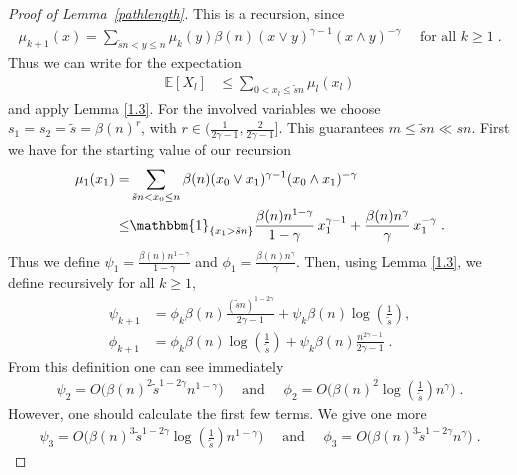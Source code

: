 \documentclass[10pt,a4paper]{amsart}
\begin{document}
\begin{proof}[Proof of Lemma~\ref{pathlength}]
	This is a recursion, since
\begin{align} \label{recurmu}
  \mu_{k+1}(x)=\sum_{\tilde sn<y\le n}\mu_k(y) \beta(n) (x \vee y)^{\gamma-1}(x \wedge y)^{-\gamma} \quad \text{ for all } k\ge1 \; .
\end{align}
Thus we can write for the expectation
\begin{align} \label{14}
		\mathbb{E}[X_l]&\le \sum_{0<x_l\le \tilde sn} \mu_l(x_l)
\end{align}
and apply Lemma \ref{1.3}. For the involved variables  we choose $s_1=s_2=\tilde s =\beta(n)^{r}$, with $r\in(\tfrac{1}{2\gamma-1},\tfrac{2}{2\gamma-1}]$. This guarantees $m\le \tilde s n \ll sn$.
 First we have for the starting value of our recursion
\begin{align*}
    \mu_1(x_1)= & \sum_{\tilde sn<x_{0}\le n} \beta(n)(x_0 \vee x_{1})^{\gamma-1}(x_0 \wedge x_{1})^{-\gamma}
		\\ \le & \mathbbm{1}_{\{x_1 >\tilde sn\}}\frac{\beta(n) n^{1-\gamma}}{1-\gamma}\, x_{1}^{\gamma-1}+\frac{\beta(n) n^{\gamma}}{\gamma}\, x_{1}^{-\gamma} \;.
\end{align*}
Thus we define $\psi_1=\tfrac{\beta(n) n^{1-\gamma}}{1-\gamma}$ and $\phi_1=\tfrac{\beta(n) n^{\gamma}}{\gamma}$. Then, using Lemma \ref{1.3}, we define recursively for all $k\ge1$,
\begin{equation}
    \label{psiphi}
\begin{aligned}
		\psi_{k+1}&=\phi_k  \beta(n)\frac{(\tilde s n)^{1-2\gamma}}{2\gamma-1}+\psi_k \beta(n) \log\left(\tfrac{1}{\tilde s}\right),
		\\ \phi_{k+1}&=\phi_k \beta(n) \log\left(\tfrac{1}{\tilde s}\right)+\psi_k \beta(n) \frac{n^{2 \gamma -1}}{2\gamma-1} \;.
\end{aligned}
\end{equation}
From this definition one can see immediately
\begin{align*}
    \psi_2 =O\Big(\beta(n)^{2}\tilde s ^{1-2\gamma} n^{1-\gamma}  \Big) \quad \text{ and } \quad
    \phi_2 =O\Big( \beta(n)^2  \log\left(\tfrac{1}{\tilde s}\right) n^{\gamma}  \Big) \;.
\end{align*}
However, one should calculate the first few terms. We give one more
\begin{align*}
    \psi_3 =O\Big(\beta(n)^{3}\tilde s ^{1-2\gamma}\log\left(\tfrac{1}{\tilde s}\right) n^{1-\gamma}  \Big) \quad \text{ and } \quad
    \phi_3 =O\Big( \beta(n)^{3}\tilde s ^{1-2\gamma}   n^{\gamma}  \Big)  \;.
\end{align*}

\end{proof}
\end{document}
